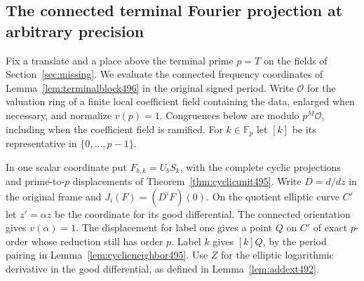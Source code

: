 \documentclass[a4paper,11pt]{article}
\theoremstyle{definition}
\theoremstyle{remark}
\numberwithin{equation}{section}
\begin{document}
\subsection{The connected terminal Fourier projection at arbitrary precision}
\label{sec:connectedprecision516}

Fix a translate and a place above the terminal prime \(p=T\) on
the fields of Section~\ref{sec:missing}. We evaluate the connected
frequency coordinates of Lemma~\ref{lem:terminalblock496} in the
original signed period. Write \(\mathcal O\) for the valuation ring
of a finite local coefficient field containing the data, enlarged
when necessary, and normalize \(v(p)=1\). Congruences below are
modulo \(p^M\mathcal O\), including when the coefficient field
is ramified. For \(k\in\mathbb F_p\) let \([k]\) be its representative
in \(\{0,\ldots,p-1\}\).

In one scalar coordinate put \(F_{b,k}=U_b S_k\), with the
complete cyclic projections and prime-to-\(p\) displacements
of Theorem~\ref{thm:cyclicunit495}. Write \(D=d/dz\) in the original
frame and \(J_i(F)=(D^iF)(0)\). On the quotient elliptic curve
\(C'\) let \(z'=\alpha z\) be the coordinate for its good
differential. The connected orientation gives \(v(\alpha)=1\).
The displacement for label one gives a point \(Q\) on \(C'\)
of exact \(p\)-order whose reduction still has order \(p\).
Label \(k\) gives \([k]Q\), by the period pairing in
Lemma~\ref{lem:cyclicneighbor495}. Use \(Z\) for the elliptic
logarithmic derivative in the good differential, as defined in
Lemma~\ref{lem:addext492}.
\end{document}
